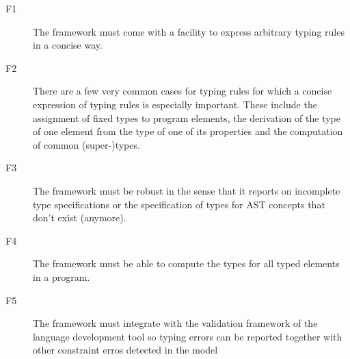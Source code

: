 \begin{description}
  \item[F1] The framework must come with a facility to express arbitrary typing
  rules in a concise way. 
  \item[F2] There are a few very common cases for typing rules for which a
  concise expression of typing rules is especially important. These include the 
  assignment of fixed types to program elements, the derivation of the type of one 
  element from the type of one of its properties and the computation of common (super-)types.
  \item[F3] The framework must be robust in the sense that it reports on
  incomplete type specifications or the specification of types for AST concepts
  that don't exist (anymore).
  \item[F4] The framework must be able to compute the types for all typed
  elements in a program. 
  \item[F5]  The framework must integrate with the validation framework of the
  language development tool so typing errors can be reported together with other
  constraint erros detected in the model
\end{description}




\endinput


Developing a compiler for a language \mv{It is not just the compiler. The whole
language definition must also be defined.} and its integration in Eclipse is
usually time consuming since it requires many phases, starting from parsing the
program, checking that is correct, up to the generation. Furthermore, these
mechanisms have to be integrated in the Eclipse IDE, which, in turn requires
more manual programming in order to provide background parsing of the program,
error marker generation, and all the tooling mechanisms to give the programmer a
good experience\mv{what is a good experience?}.  Xtext~\cite{xtext} is a
framework for language development based on Eclipse. It has successfully been
used for developing domain-specific languages (DSLs) as well as general-purpose
programming languages. It provides high-level mechanisms that significantly
simplify the development of the artifacts necessary for a fully-fledged IDE on
top of Eclipse.

